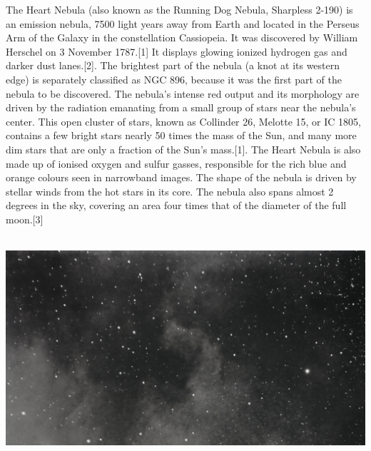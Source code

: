 {\footnotesize\color{white}
The Heart Nebula (also known as the Running Dog Nebula, Sharpless 2-190) is an emission nebula, 7500 light years away from Earth and located in the Perseus Arm of the Galaxy in the constellation Cassiopeia. It was discovered by William Herschel on 3 November 1787.[1] It displays glowing ionized hydrogen gas and darker dust lanes.[2]. The brightest part of the nebula (a knot at its western edge) is separately classified as NGC 896, because it was the first part of the nebula to be discovered. The nebula's intense red output and its morphology are driven by the radiation emanating from a small group of stars near the nebula's center. This open cluster of stars, known as Collinder 26, Melotte 15, or IC 1805, contains a few bright stars nearly 50 times the mass of the Sun, and many more dim stars that are only a fraction of the Sun's mass.[1]. The Heart Nebula is also made up of ionised oxygen and sulfur gasses, responsible for the rich blue and orange colours seen in narrowband images. The shape of the nebula is driven by stellar winds from the hot stars in its core. The nebula also spans almost 2 degrees in the sky, covering an area four times that of the diameter of the full moon.[3]


}\ \\
\includegraphics[width=\textwidth]{../Imaging//Grayscale/Northamerica_Nebula.jpg}
